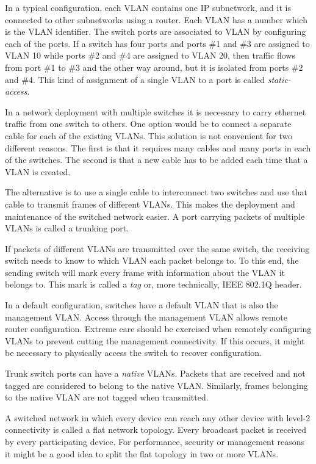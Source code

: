 In a typical configuration, each VLAN contains one IP subnetwork, and it is connected to other subnetworks using a router.
Each VLAN has a number which is the VLAN identifier.
The switch ports are associated to VLAN by configuring each of the ports.
If a switch has four ports and ports \#1 and \#3 are assigned to VLAN 10 while ports \#2 and \#4 are assigned to VLAN 20, then traffic flows from port \#1 to \#3 and the other way around, but it is isolated from ports \#2 and \#4.
This kind of assignment of a single VLAN to a port is called \emph{static-access}.


In a network deployment with multiple switches it is necessary to carry ethernet traffic from one switch to others.
One option would be to connect a separate cable for each of the existing VLANs.
This solution is not convenient for two different reasons.
The first is that it requires many cables and many ports in each of the switches.
The second is that a new cable has to be added each time that a VLAN is created.

The alternative is to use a single cable to interconnect two switches and use that cable to transmit frames of different VLANs.
This makes the deployment and maintenance of the switched network easier.
A port carrying packets of multiple VLANs is called a trunking port.

If packets of different VLANs are transmitted over the same switch, the receiving switch needs to know to which VLAN each packet belongs to.
To this end, the sending switch will mark every frame with information about the VLAN it belongs to.
This mark is called a \emph{tag} or, more technically, IEEE 802.1Q header.

In a default configuration, switches have a default VLAN that is also the management VLAN.
Access through the management VLAN allows remote router configuration.
Extreme care should be exercised when remotely configuring VLANs to prevent cutting the management connectivity.
If this occurs, it might be necessary to physically access the switch to recover configuration.

Trunk switch ports can have a \emph{native} VLANs.
Packets that are received and not tagged are considered to belong to the native VLAN.
Similarly, frames belonging to the native VLAN are not tagged when transmitted.


A switched network in which every device can reach any other device with level-2 connectivity is called a flat network topology.
Every broadcast packet is received by every participating device.
For performance, security or management reasons it might be a good idea to split the flat topology in two or more VLANs.

